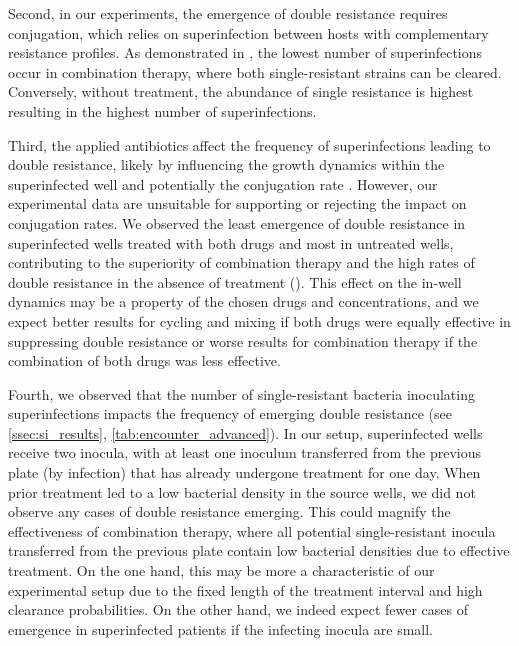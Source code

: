 Second, in our experiments, the emergence of double resistance requires conjugation, which relies on superinfection between hosts with complementary resistance profiles.
As demonstrated in , the lowest number of superinfections occur in combination therapy, where both single-resistant strains can be cleared.
Conversely, without treatment, the abundance of single resistance is highest resulting in the highest number of superinfections.

Third, the applied antibiotics affect the frequency of superinfections leading to double resistance, likely by influencing the growth dynamics within the superinfected well and potentially the conjugation rate \cite{Headd2018}.
However, our experimental data are unsuitable for supporting or rejecting the impact on conjugation rates.
We observed the least emergence of double resistance in superinfected wells treated with both drugs and most in untreated wells, contributing to the superiority of combination therapy and the high rates of double resistance in the absence of treatment ().
This effect on the in-well dynamics may be a property of the chosen drugs and concentrations, and we expect better results for cycling and mixing if both drugs were equally effective in suppressing double resistance or worse results for combination therapy if the combination of both drugs was less effective.

Fourth, we observed that the number of single-resistant bacteria inoculating superinfections impacts the frequency of emerging double resistance (see \autoref{ssec:si_results}, \autoref{tab:encounter_advanced}).
In our setup, superinfected wells receive two inocula, with at least one inoculum transferred from the previous plate (by infection) that has already undergone treatment for one day.
When prior treatment led to a low bacterial density in the source wells, we did not observe any cases of double resistance emerging.
This could magnify the effectiveness of combination therapy, where all potential single-resistant inocula transferred from the previous plate contain low bacterial densities due to effective treatment.
On the one hand, this may be more a characteristic of our experimental setup due to the fixed length of the treatment interval and high clearance probabilities.
On the other hand, we indeed expect fewer cases of emergence in superinfected patients if the infecting inocula are small.

